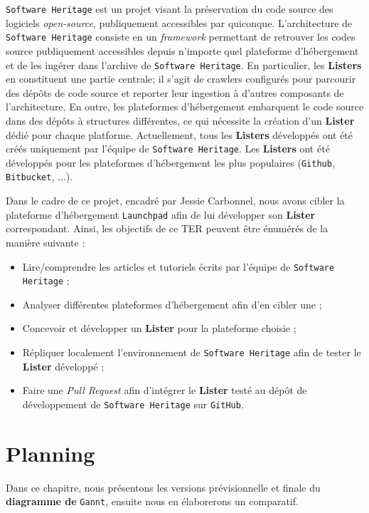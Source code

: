 \documentclass[12pt,a4paper]{report}
\begin{document}
\texttt{Software Heritage} est un projet visant la préservation du code source des logiciels \textit{open-source}, publiquement accessibles par quiconque. L'architecture de \texttt{Software Heritage} consiste en un \textit{framework} permettant de retrouver les codes source publiquement accessibles depuis n'importe quel plateforme d'hébergement et de les ingérer dans l'archive de \texttt{Software Heritage}. En particulier, les \textbf{Listers} en constituent une partie centrale; il s'agit de crawlers configurés pour parcourir des dépôts de code source et reporter leur ingestion à d'autres composants de l'architecture. En outre, les plateformes d'hébergement embarquent le code source dans des dépôts à structures différentes, ce qui nécessite la création d'un \textbf{Lister} dédié pour chaque platforme. Actuellement, tous les \textbf{Listers} développés ont été créés uniquement par l'équipe de \texttt{Software Heritage}. Les \textbf{Listers} ont été développés pour les plateformes d'hébergement les plus populaires (\texttt{Github}, \texttt{Bitbucket}, $\dots$).

Dans le cadre de ce projet, encadré par Jessie Carbonnel, nous avons cibler la plateforme d'hébergement \texttt{Launchpad} afin de lui développer son \textbf{Lister} correspondant. Ainsi, les objectifs de ce TER peuvent être énumérés de la manière suivante :
\begin{itemize}
  \item Lire/comprendre les articles et tutoriels écrits par l'équipe de \texttt{Software Heritage} ;
  \item Analyser différentes plateformes d'hébergement afin d'en cibler une ;
  \item Concevoir et développer un \textbf{Lister} pour la plateforme choisie ;
  \item Répliquer localement l'environnement de \texttt{Software Heritage} afin de tester le \textbf{Lister} développé ;
  \item Faire une \textit{Pull Request} afin d'intégrer le \textbf{Lister} testé au dépôt de développement de \texttt{Software Heritage} sur \texttt{GitHub}.
\end{itemize}

\chapter{Planning}
Dans ce chapitre, nous présentons les versions prévisionnelle et finale du \textbf{diagramme de} \texttt{Gannt}, ensuite nous en élaborerons un comparatif.
\end{document}
